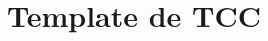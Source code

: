 \documentclass[minted]{tcc}
\title{Template de TCC}
\begin{document}
\maketitle{}

\toc{}







\nocite{*} %
\printbibliography{}
\end{document}
